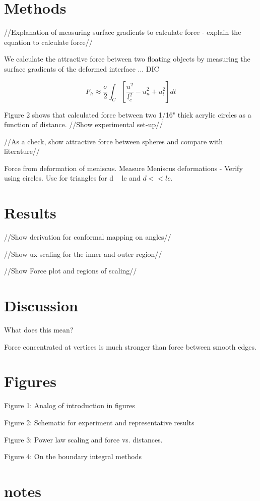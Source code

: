 \documentclass[twocolumn,prl]{revtex4-1}
\begin{document}
	 

\section{Methods}
//Explanation of measuring surface gradients to calculate force - explain the equation to calculate force//

We calculate the attractive force between two floating objects by measuring the surface gradients of the deformed interface ... DIC

\begin{equation}
F_h \approx \frac{\sigma}{2} \int _C [\frac{u^2}{l_c^2}- u_n^2 +u_t^2] dt
\end{equation}

Figure 2 shows that calculated force between two 1/16" thick acrylic circles as a function of distance.
//Show experimental set-up//

//As a check, show attractive force between spheres and compare with literature//

Force from deformation of meniscus. Measure Meniscus deformations - Verify using circles. Use for triangles for d ~ lc and $d << lc$.

\section{Results}
//Show derivation for conformal mapping on angles//

//Show ux scaling for the inner and outer region//

//Show Force plot and regions of scaling//

\section{Discussion}
What does this mean?

Force concentrated at vertices is much stronger than force between smooth edges.

\section{Figures}
Figure 1: Analog of introduction in figures

Figure 2: Schematic for experiment and representative results 

Figure 3: Power law scaling and force vs. distances.

Figure 4: On the boundary integral methods

\section{notes}
\end{document}
